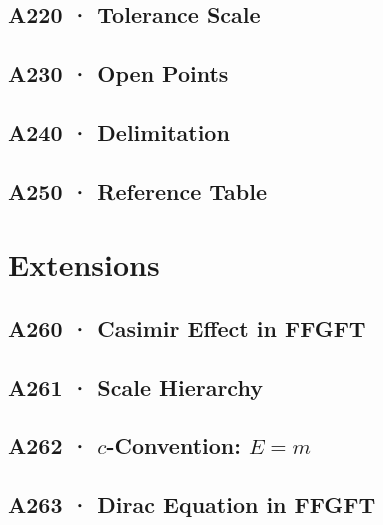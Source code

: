\documentclass[11pt,twoside,openright]{book}
\begin{document}
\chapter[A220 · Tolerance Scale]{A220 · Tolerance Scale}


\chapter[A230 · Open Points]{A230 · Open Points}


\chapter[A240 · Delimitation]{A240 · Delimitation}


\chapter[A250 · Reference Table]{A250 · Reference Table}


\part{Extensions}

\chapter[A260 · Casimir Effect]{A260 · Casimir Effect in FFGFT}


\chapter[A261 · Scale Hierarchy]{A261 · Scale Hierarchy}


\chapter[A262 · $c$-Convention]{A262 · $c$-Convention: $E=m$}


\chapter[A263 · Dirac Equation]{A263 · Dirac Equation in FFGFT}

\end{document}
